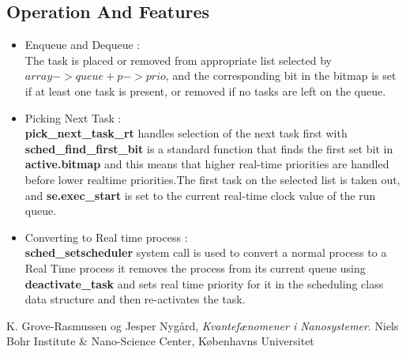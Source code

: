 \documentclass[a4paper]{article}
\begin{document}
\subsection{Operation And Features}
\begin{itemize}
\item Enqueue and Dequeue : \\The task is placed or removed from  appropriate
list selected by \textbf{$array->queue + p->prio$}, and the corresponding bit in the bitmap is set if at least one task is present, or removed if no tasks are left on the queue.
\item Picking Next Task : \\ \textbf{pick\_next\_task\_rt} handles selection of the next task first with \textbf{sched\_find\_first\_bit} is a standard function that finds the first set bit in \textbf{active.bitmap} and this means that higher real-time priorities are handled before lower realtime priorities.The first task on the selected list is taken out, and \textbf{se.exec\_start} is set to the current real-time clock value of the run queue.
\item Converting to Real time process :\\
\textbf{sched\_setscheduler} system call is used to convert a normal process to a Real Time process it  removes the process from its current queue using \textbf{deactivate\_task} and sets real time priority for it in the scheduling class data structure and then re-activates the task.
\end{itemize}

\newpage

\begin{thebibliography}{9}
  K. Grove-Rasmussen og Jesper Nygård,
  \emph{Kvantefænomener i Nanosystemer}.
  Niels Bohr Institute \& Nano-Science Center, Københavns Universitet

\end{thebibliography}
\end{document}
